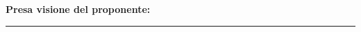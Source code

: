 \vspace*{\fill}
\begin{flushright}
    \textbf{Presa visione del proponente:}

    \vspace{1.5cm}
    \rule{7cm}{0.4pt}
\end{flushright}